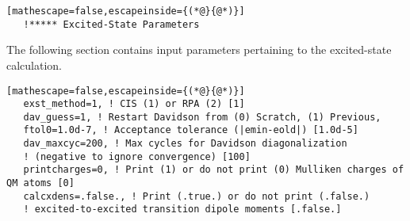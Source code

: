 \begin{lstlisting}[mathescape=false,escapeinside={(*@}{@*)}]
   !***** Excited-State Parameters
\end{lstlisting}
\noindent The following section contains input parameters pertaining to the excited-state calculation.
\begin{lstlisting}[mathescape=false,escapeinside={(*@}{@*)}]
   exst_method=1, ! CIS (1) or RPA (2) [1]
   dav_guess=1, ! Restart Davidson from (0) Scratch, (1) Previous, 
   ftol0=1.0d-7, ! Acceptance tolerance (|emin-eold|) [1.0d-5]
   dav_maxcyc=200, ! Max cycles for Davidson diagonalization 
   ! (negative to ignore convergence) [100]
   printcharges=0, ! Print (1) or do not print (0) Mulliken charges of QM atoms [0]
   calcxdens=.false., ! Print (.true.) or do not print (.false.) 
   ! excited-to-excited transition dipole moments [.false.]
\end{lstlisting}
